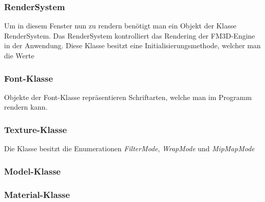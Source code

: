 \subsubsection{RenderSystem}
Um in diesem Fenster nun zu rendern benötigt man ein Objekt der Klasse RenderSystem. Das RenderSystem kontrolliert das Rendering der FM3D-Engine in der Anwendung. Diese Klasse besitzt eine Initialisierungsmethode, welcher man die Werte 

\subsubsection{Font-Klasse}
\label{Fontclass}
Objekte der Font-Klasse repräsentieren Schriftarten, welche man im Programm rendern kann.
\todo[inline]{!!!}
\subsubsection{Texture-Klasse}
\label{Textureclass}
Die Klasse besitzt die Enumerationen \textit{FilterMode}, \textit{WrapMode} und \textit{MipMapMode}
\todo[inline]{!!!}
\subsubsection{Model-Klasse}
\label{Modelclass}
\todo[inline]{!!!}
\subsubsection{Material-Klasse}
\todo[inline]{!!!}



